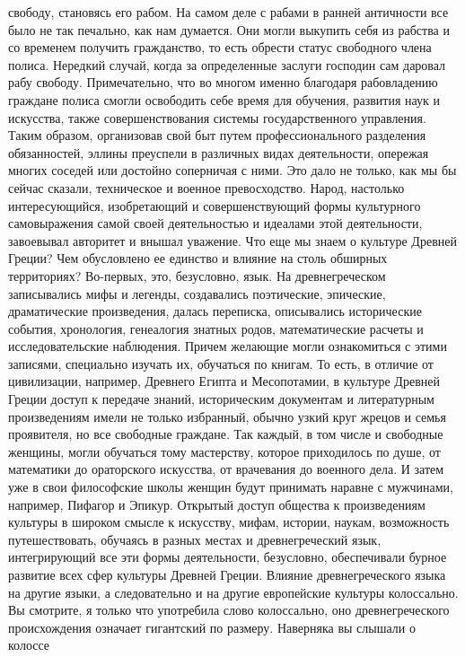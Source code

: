 свободу, становясь его рабом. На самом деле с рабами в ранней античности все
было не так печально, как нам думается. Они могли выкупить себя из рабства и со
временем получить гражданство, то есть обрести статус свободного члена полиса.
Нередкий случай, когда за определенные заслуги господин сам даровал рабу
свободу. Примечательно, что во многом именно благодаря рабовладению граждане
полиса смогли освободить себе время для обучения, развития наук и искусства,
также совершенствования системы государственного управления. Таким образом,
организовав свой быт путем профессионального разделения обязанностей, эллины
преуспели в различных видах деятельности, опережая многих соседей или достойно
соперничая с ними. Это дало не только, как мы бы сейчас сказали, техническое и
военное превосходство. Народ, настолько интересующийся, изобретающий и
совершенствующий формы культурного самовыражения самой своей деятельностью и
идеалами этой деятельности, завоевывал авторитет и внышал уважение. Что еще мы
знаем о культуре Древней Греции? Чем обусловлено ее единство и влияние на столь
обширных территориях? Во-первых, это, безусловно, язык. На древнегреческом
записывались мифы и легенды, создавались поэтические, эпические, драматические
произведения, далась переписка, описывались исторические события, хронология,
генеалогия знатных родов, математические расчеты и исследовательские наблюдения.
Причем желающие могли ознакомиться с этими записями, специально изучать их,
обучаться по книгам. То есть, в отличие от цивилизации, например, Древнего
Египта и Месопотамии, в культуре Древней Греции доступ к передаче знаний,
историческим документам и литературным произведениям имели не только избранный,
обычно узкий круг жрецов и семья проявителя, но все свободные граждане. Так
каждый, в том числе и свободные женщины, могли обучаться тому мастерству,
которое приходилось по душе, от математики до ораторского искусства, от
врачевания до военного дела. И затем уже в свои философские школы женщин будут
принимать наравне с мужчинами, например, Пифагор и Эпикур. Открытый доступ
общества к произведениям культуры в широком смысле к искусству, мифам, истории,
наукам, возможность путешествовать, обучаясь в разных местах и древнегреческий
язык, интегрирующий все эти формы деятельности, безусловно, обеспечивали бурное
развитие всех сфер культуры Древней Греции. Влияние древнегреческого языка на
другие языки, а следовательно и на другие европейские культуры колоссально. Вы
смотрите, я только что употребила слово колоссально, оно древнегреческого
происхождения означает гигантский по размеру. Наверняка вы слышали о колоссе
